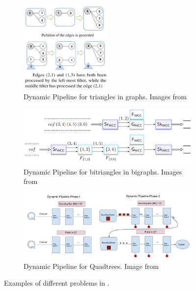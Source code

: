 \begin{figure}
    \centering
    \begin{subfigure}{\textwidth}
    \centering
        \includegraphics[width=0.5\textwidth]{figures/ExampleTriangles.png}
        \caption{Dynamic Pipeline for triangles in graphs. Images from \cite{Pasarella2017}}
    \end{subfigure}
    \hfill
    \begin{subfigure}{\textwidth}
    \centering
        \includegraphics[width=\textwidth]{figures/ExampleBiTriangles.png}
        \caption{Dynamic Pipeline for bitriangles in bigraphs. Images from \cite{Royo_Sales_2021}}
    \end{subfigure}
    \hfill
    \begin{subfigure}{\textwidth}
    \centering
       \includegraphics[width=\textwidth]{figures/ExampleQuadtree.png} 
       \caption{Dynamic Pipeline for Quadtrees. Image from \cite{Lugosi_Enes_2019}}
    \end{subfigure}
    \caption{Examples of different problems in \dpm.\label{fig:examples_dp}}
\end{figure}